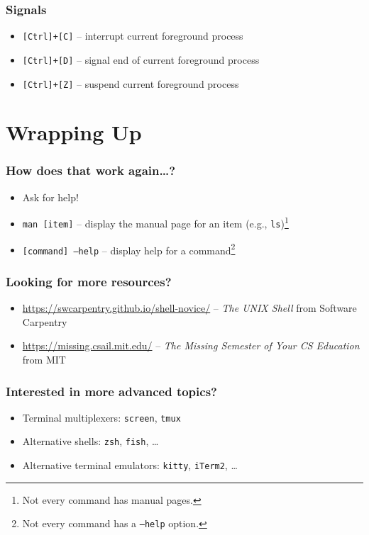 \documentclass[aspectratio=169]{beamer}
\begin{document}
\begin{frame}
	\frametitle{Signals}
	\begin{itemize}
		\item \texttt{[Ctrl]+[C]} -- interrupt current foreground process
		\item \texttt{[Ctrl]+[D]} -- signal end of current foreground process
		\item \texttt{[Ctrl]+[Z]} -- suspend current foreground process
	\end{itemize}
\end{frame}


\section{Wrapping Up}

\frame{\sectionpage}

\begin{frame}
	\frametitle{How does that work again\dots?}
	\begin{itemize}
		\item Ask for help!
		\item \texttt{man [item]} -- display the manual page for an item (e.g., \texttt{ls})\footnote{Not every command has manual pages.}
		\item \texttt{[command] --help} -- display help for a command\footnote{Not every command has a \texttt{--help} option.}
	\end{itemize}
\end{frame}

\begin{frame}
	\frametitle{Looking for more resources?}
	\begin{itemize}
		\item \url{https://swcarpentry.github.io/shell-novice/} -- \textit{The UNIX Shell} from Software Carpentry
		\item \url{https://missing.csail.mit.edu/} -- \textit{The Missing Semester of Your CS Education} from MIT
	\end{itemize}
\end{frame}

\begin{frame}
	\frametitle{Interested in more advanced topics?}
	\begin{itemize}
		\item Terminal multiplexers: \texttt{screen}, \texttt{tmux}
		\item Alternative shells: \texttt{zsh}, \texttt{fish}, \dots
		\item Alternative terminal emulators: \texttt{kitty}, \texttt{iTerm2}, \dots
	\end{itemize}
\end{frame}
\end{document}
